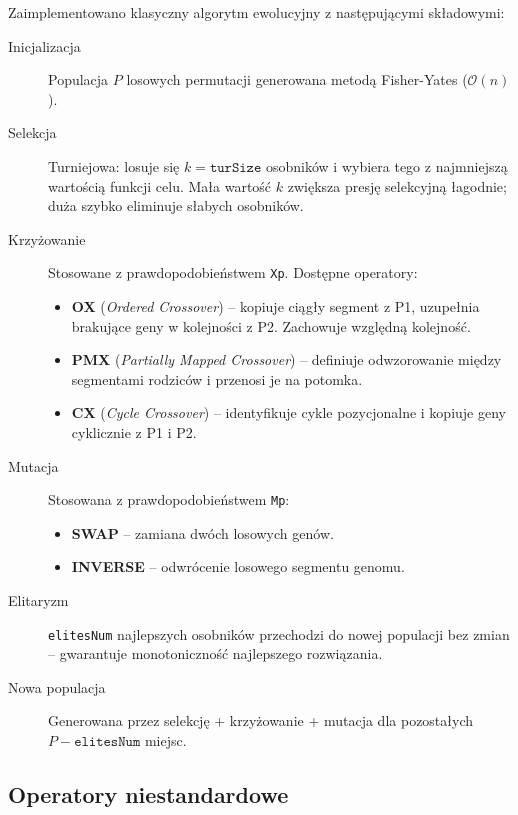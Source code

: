 \documentclass[11pt,a4paper]{article}
\begin{document}
Zaimplementowano klasyczny algorytm ewolucyjny z następującymi składowymi:

\begin{description}
    \item[Inicjalizacja] Populacja $P$ losowych permutacji generowana metodą
          Fisher-Yates ($\mathcal{O}(n)$).
    \item[Selekcja] Turniejowa: losuje się $k = \texttt{turSize}$ osobników
          i wybiera tego z najmniejszą wartością funkcji celu.
          Mała wartość $k$ zwiększa presję selekcyjną łagodnie; duża szybko
          eliminuje słabych osobników.
    \item[Krzyżowanie] Stosowane z prawdopodobieństwem \texttt{Xp}. Dostępne operatory:
          \begin{itemize}
              \item \textbf{OX} (\textit{Ordered Crossover}) -- kopiuje ciągły segment z P1,
                    uzupełnia brakujące geny w kolejności z P2. Zachowuje względną kolejność.
              \item \textbf{PMX} (\textit{Partially Mapped Crossover}) -- definiuje odwzorowanie
                    między segmentami rodziców i przenosi je na potomka.
              \item \textbf{CX} (\textit{Cycle Crossover}) -- identyfikuje cykle pozycjonalne
                    i kopiuje geny cyklicznie z P1 i P2.
          \end{itemize}
    \item[Mutacja] Stosowana z prawdopodobieństwem \texttt{Mp}:
          \begin{itemize}
              \item \textbf{SWAP} -- zamiana dwóch losowych genów.
              \item \textbf{INVERSE} -- odwrócenie losowego segmentu genomu.
          \end{itemize}
    \item[Elitaryzm] \texttt{elitesNum} najlepszych osobników przechodzi do nowej
          populacji bez zmian -- gwarantuje monotoniczność najlepszego rozwiązania.
    \item[Nowa populacja] Generowana przez selekcję + krzyżowanie + mutacja
          dla pozostałych $P - \texttt{elitesNum}$ miejsc.
\end{description}

\subsection{Operatory niestandardowe}
\label{sec:custom_ops}
\end{document}

